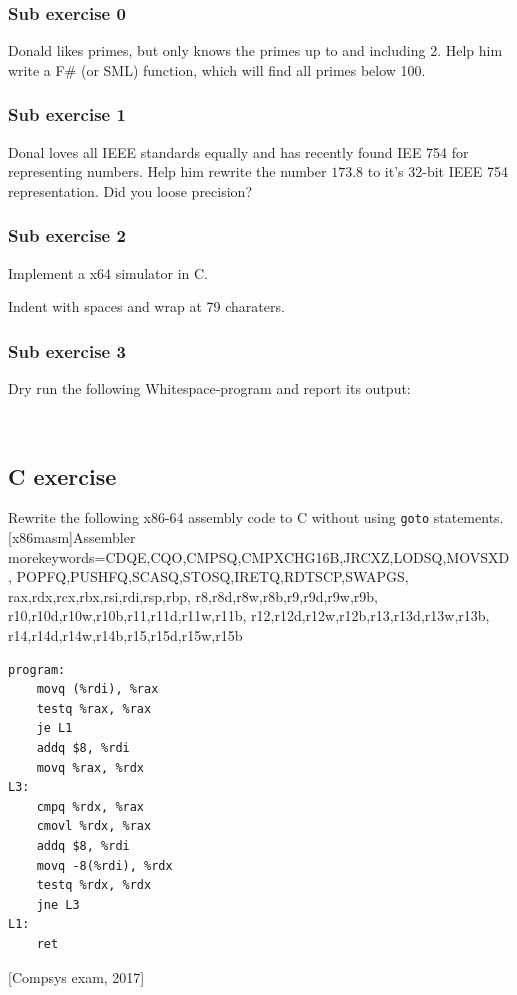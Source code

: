 \subsubsection{Sub exercise 0}
\vspace{-0.2cm}

Donald likes primes, but only knows the primes up to and including 2. Help him
write a F\# (or SML) function, which will find all primes below 100.

\subsubsection{Sub exercise  1}

Donal loves all IEEE standards equally and has recently found IEE 754 for
representing numbers. Help him rewrite the number $173.8$ to it's 32-bit IEEE
754 representation. Did you loose precision?

\subsubsection{Sub exercise 2}
\vspace{-0.2cm}

Implement a x64 simulator in C.

Indent with spaces and wrap at 79 charaters.

\subsubsection{Sub exercise 3}
\vspace{-0.2cm}

Dry run the following Whitespace-program and report its output:
\begin{verbatim}


\end{verbatim}

\newpage
\subsection{C exercise}
Rewrite the following x86-64 assembly code to C without using \verb|goto|
statements.
   [x86masm]{Assembler} %
   {morekeywords={CDQE,CQO,CMPSQ,CMPXCHG16B,JRCXZ,LODSQ,MOVSXD, %
                  POPFQ,PUSHFQ,SCASQ,STOSQ,IRETQ,RDTSCP,SWAPGS, %
                  rax,rdx,rcx,rbx,rsi,rdi,rsp,rbp, %
                  r8,r8d,r8w,r8b,r9,r9d,r9w,r9b, %
                  r10,r10d,r10w,r10b,r11,r11d,r11w,r11b, %
                  r12,r12d,r12w,r12b,r13,r13d,r13w,r13b, %
                  r14,r14d,r14w,r14b,r15,r15d,r15w,r15b}} %
\begin{lstlisting}[language={[x64]Assembler}]
program:
    movq (%rdi), %rax
    testq %rax, %rax
    je L1
    addq $8, %rdi
    movq %rax, %rdx
L3:
    cmpq %rdx, %rax
    cmovl %rdx, %rax
    addq $8, %rdi
    movq -8(%rdi), %rdx
    testq %rdx, %rdx
    jne L3
L1:
    ret
\end{lstlisting}
[Compsys exam, 2017]

